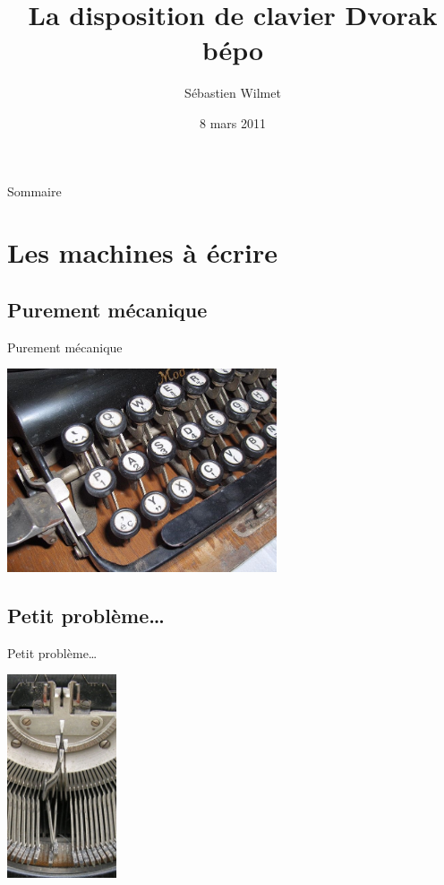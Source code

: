 \documentclass{beamer}
\title{La disposition de clavier Dvorak bépo}
\author{Sébastien Wilmet}
\date{8 mars 2011}
\institute{LouviLUG}
\begin{document}
\begin{frame}
  \titlepage
\end{frame}

\begin{frame}{Sommaire}
  \tableofcontents[hideallsubsections]
\end{frame}

\section{Les machines à écrire}
\begin{frame}
  \tableofcontents[sectionstyle=show/shaded, hideothersubsections]
\end{frame}

\subsection{Purement mécanique}
\begin{frame}{Purement mécanique}
\begin{center}
\includegraphics[height=6cm]{machine-a-ecrire.jpg}
\end{center}
\end{frame}

\subsection{Petit problème…}
\begin{frame}{Petit problème…}
\begin{center}
\includegraphics[height=6cm]{barres-coincees.jpg}
\end{center}
\end{frame}
\end{document}
